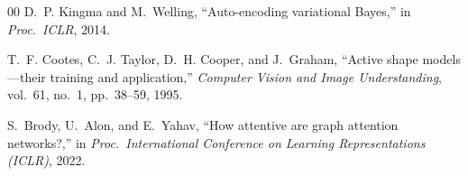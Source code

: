 \documentclass[conference]{IEEEtran}
\begin{document}
\begin{thebibliography}{00}
D.~P. Kingma and M.~Welling,
``Auto-encoding variational Bayes,''
in \textit{Proc.\ ICLR}, 2014.

T.~F. Cootes, C.~J. Taylor, D.~H. Cooper, and J.~Graham,
``Active shape models---their training and application,''
\textit{Computer Vision and Image Understanding}, vol.~61, no.~1, pp.~38--59, 1995.

S.~Brody, U.~Alon, and E.~Yahav,
``How attentive are graph attention networks?,''
in \textit{Proc.\ International Conference on Learning Representations (ICLR)}, 2022.

\end{thebibliography}
\end{document}
